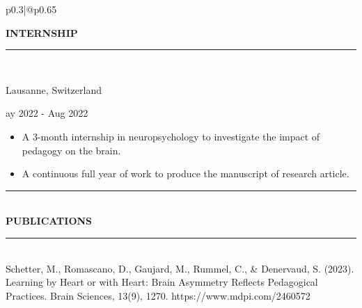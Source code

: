 \documentclass[12pt,a4paper]{article}
\newcommand{\myline}[1]{\rule{#1}{1.0pt}\\}
\newcommand{\topic}[1]{\textbf{\Large\selectfont\MakeUppercase{#1}}\\\vspace{-0.5cm}\myline{1.0cm}}
\newcommand{\lsubtopic}[3]{
  \begin{minipage}[t]{0.7\linewidth}
    \textbf{\normalsize\selectfont{#1}}
  \end{minipage}
  \hfill
  \begin{minipage}[t]{0.25\linewidth}
    \raggedleft
    {#2\\}
  \end{minipage}
  \par
}
\begin{document}
\begin{multicols}{2}
\begin{tabular}{p{0.3\textwidth}|@{\hspace{5mm}}p{0.65\textwidth}}
{\begin{flushleft}
\topic{internship} %
    \lsubtopic{Brain research, CHUV Lausanne}{Lausanne, Switzerland}

    May 2022 - Aug 2022 %
    \begin{itemize}
        \setlength\itemsep{-0.5em}
    \item A 3-month internship in neuropsychology to investigate the impact of pedagogy on the brain.
    \item A continuous full year of work to produce the manuscript of research article.
    \end{itemize}

    \textcolor{gray!50}{\rule{\linewidth}{0.5pt}}\\
    \topic{Publications}
    
    Schetter, M., Romascano, D., Gaujard, M., Rummel, C., \& Denervaud, S. (2023). Learning by Heart or with Heart: Brain Asymmetry Reflects Pedagogical Practices. Brain Sciences, 13(9), 1270.
    https://www.mdpi.com/2460572

\end{flushleft}
}
\end{tabular}
\end{multicols}






\end{document}
